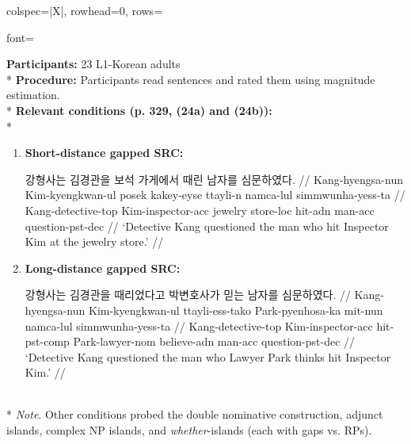 \begin{longtblr}[caption={\textcite{han2013}: Acceptability judgment task (Experiment 1)}, label={tblr:gap-sl-h13}]{colspec={|X|}, rowhead=0, rows={font=\raggedright{}}}\hline
\textbf{Participants:} 23 L1-Korean adults \vspace{5pt}\\*
\textbf{Procedure:} Participants read sentences and rated them using magnitude estimation. \vspace{5pt}\\*
\textbf{Relevant conditions (p. 329, (24a) and (24b)):} \vspace{5pt}\\*
\begin{varwidth}{\linewidth}\begin{enumerate}[\bfseries (a),itemsep=5pt] 
\item \textbf{Short-distance gapped SRC:}\par\nobreak\vspace{3pt}
\hspace{5pt}\begin{minipage}{0.85\linewidth}
\begingl[everygla = \ko]
\gla 강형사는 김경관을 보석 가게에서 때린 남자를 심문하였다. //
\glb Kang-hyengsa-nun Kim-kyengkwan-ul posek kakey-eyse ttayli-n namca-lul simmwunha-yess-ta //
\glc Kang-detective-{\sc top} Kim-inspector-{\sc acc} jewelry store-{\sc loc} hit-{\sc adn} man-{\sc acc} question-{\sc pst-dec} //
\glft `Detective Kang questioned the man who hit Inspector Kim at the jewelry store.' //
\endgl
\end{minipage}
\item \textbf{Long-distance gapped SRC:}\par\nobreak\vspace{3pt}
\hspace{5pt}\begin{minipage}{0.85\linewidth}
\begingl[everygla = \ko]
\gla 강형사는 김경관을 때리었다고 박변호사가 믿는 남자를 심문하였다. //
\glb Kang-hyengsa-nun Kim-kyengkwan-ul ttayli-ess-tako Park-pyenhosa-ka mit-nun namca-lul simmwunha-yess-ta //
\glc Kang-detective-{\sc top} Kim-inspector-{\sc acc} hit-{\sc pst-comp} Park-lawyer-{\sc nom} believe-{\sc adn} man-{\sc acc} question-{\sc pst-dec} //
\glft `Detective Kang questioned the man who Lawyer Park thinks hit Inspector Kim.' //
\endgl
\end{minipage}
\end{enumerate}\end{varwidth}\vspace{5pt}\\*
\textit{Note}. Other conditions probed the double nominative construction, adjunct islands, complex NP islands, and \textit{whether}-islands (each with gaps vs. RPs).\\\hline
\end{longtblr}

